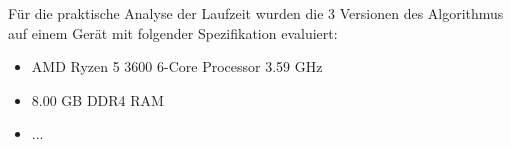 \documentclass[course=erap]{aspdoc}
\begin{document}
\par
Für die praktische Analyse der Laufzeit wurden die 3 Versionen des Algorithmus auf einem Gerät mit folgender Spezifikation evaluiert:

\begin{itemize}
\item AMD Ryzen 5 3600 6-Core Processor 3.59 GHz
\item 8.00 GB DDR4 RAM
\item ...
\end{itemize}





\end{document}

